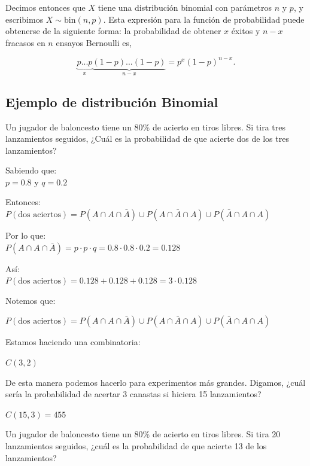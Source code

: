 Decimos entonces que $X$ tiene una distribución binomial con parámetros $n$ y
$p$, y escribimos $X \sim \text{bin}(n,p)$. Esta expresión para la función de
probabilidad puede obtenerse de la siguiente forma: la probabilidad de obtener
$x$ éxitos y $n-x$ fracasos en $n$ ensayos Bernoulli es,

\begin{equation}
    \underbrace{p...p}_{x} \underbrace{(1-p)...(1-p)}_{n-x} = p^x(1-p)^{n-x}.
\end{equation}

\subsection{Ejemplo de distribución Binomial}

Un jugador de baloncesto tiene un 80\% de acierto en tiros libres. Si tira tres
lanzamientos seguidos, ¿Cuál es la probabilidad de que acierte dos de los tres
lanzamientos?

Sabiendo que:\\

$p = 0.8$ y  $q = 0.2$

Entonces: \\

$P(\text{dos aciertos}) = P(A \cap A \cap \bar{A}) 
                      \cup P(A \cap \bar{A} \cap A)
                      \cup P(\bar{A} \cap A \cap A )$

Por lo que: \\
$P(A \cap A \cap \bar{A}) = p \cdot p \cdot q 
                          = 0.8 \cdot 0.8 \cdot 0.2 
                          = 0.128$

Así: \\

$P(\text{dos aciertos}) = 0.128 + 0.128 + 0.128 = 3 \cdot 0.128$

Notemos que:

$P(\text{dos aciertos}) = P(A \cap A \cap \bar{A}) 
                      \cup P(A \cap \bar{A} \cap A)
                      \cup P(\bar{A} \cap A \cap A )$
                      
Estamos haciendo una combinatoria:

$C(3,2)$

De esta manera podemos hacerlo para experimentos más grandes. Digamos, ¿cuál
sería la probabilidad de acertar 3 canastas si hiciera 15 lanzamientos?

$C(15,3) = 455$

Un jugador de baloncesto tiene un 80\% de acierto en tiros libres. Si tira 20
lanzamientos seguidos, ¿cuál es la probabilidad de que acierte 13 de los
lanzamientos?
  
